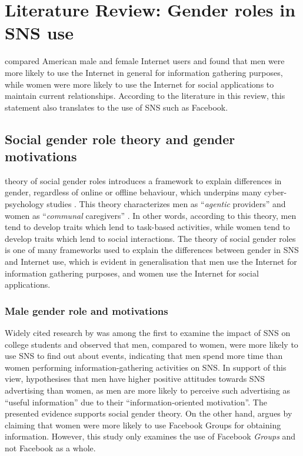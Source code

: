 \section{Literature Review: Gender roles in SNS use}

\citet{Fallows2005} compared American male and female Internet users and found that men were more likely to use the Internet in general for information gathering purposes, while women were more likely to use the Internet for social applications to maintain current relationships. According to the literature in this review, this statement also translates to the use of SNS such as Facebook.

\subsection{Social gender role theory and gender motivations}

 theory of social gender roles introduces a framework to explain differences in gender, regardless of online or offline behaviour, which underpins many cyber-psychology studies \citep{Hum2011, Tifferet2014, Kimbrough2013}. This theory characterizes men as ``\emph{agentic} providers'' and women as ``\emph{communal} caregivers'' \citep[p. 1830]{Hum2011}. In other words, according to this theory, men tend to develop traits which lend to task-based activities, while women tend to develop traits which lend to social interactions. The theory of social gender roles is one of many frameworks used to explain the differences between gender in SNS and Internet use, which is evident in  generalisation that men use the Internet for information gathering purposes, and women use the Internet for social applications.

\subsubsection{Male gender role and motivations}

Widely cited research by \citet{Raacke2008} was among the first to examine the impact of SNS on college students and observed that men, compared to women, were more likely to use SNS to find out about events, indicating that men spend more time than women performing information-gathering activities on SNS. In support of this view, \citet[p. 2]{Choi2014} hypothesises that men have higher positive attitudes towards SNS advertising than women, as men are more likely to perceive such advertising as ``useful information'' due to their ``information-oriented motivation''. The presented evidence supports  social gender theory. On the other hand, \citet{Park2009} argues by claiming that women were more likely to use Facebook Groups for obtaining information. However, this study only examines the use of Facebook \emph{Groups} and not Facebook as a whole. 

